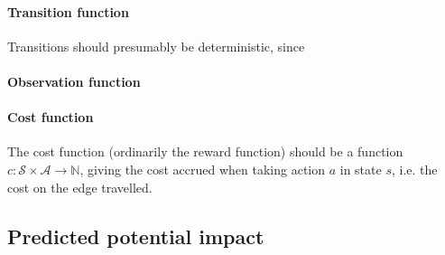 \paragraph{Transition function} Transitions should presumably be deterministic, since 

\paragraph{Observation function} 

\paragraph{Cost function} The cost function (ordinarily the reward function) should be a function $c \colon \mathcal S \times \mathcal A \to \mathbb N$, giving the cost accrued when taking action $a$ in state $s$, i.e. the cost on the edge travelled. %

\subsection{Predicted potential impact}








